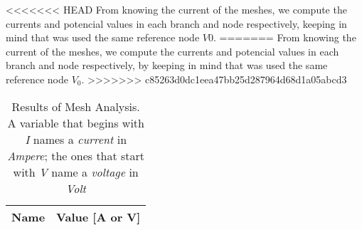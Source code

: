 <<<<<<< HEAD
From knowing the current of the meshes, we compute the currents and  potencial values in each branch and node respectively, keeping in mind that was used the same reference node $V0$.
=======
From knowing the current of the meshes, we compute the currents and  potencial values in each branch and node respectively, by keeping in mind that was used the same reference node $V_0$.
>>>>>>> c85263d0dc1eea47bb25d287964d68d1a05abcd3


\begin{table}[h]
  \centering
  \begin{tabular}{|l|r|}
    \hline
    {\bf Name} & {\bf Value [A or V]} \\ \hline
    
  \end{tabular}
  \caption{Results of Mesh Analysis. A variable that begins  with \textit{I} names a \textit{current} in \textit{Ampere}; the ones that start with \textit{V} name a \textit{voltage} in \textit{Volt}}
  \label{tab:op_mesh_tab}
\end{table}





